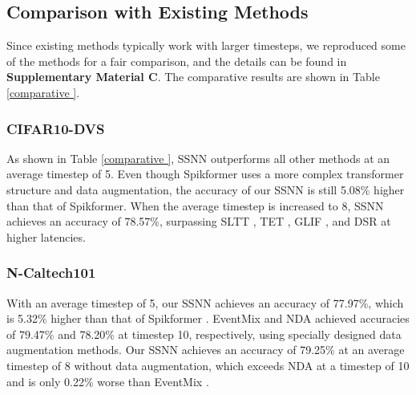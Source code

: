 \documentclass[letterpaper]{article} %
\begin{document}
\subsection{Comparison with Existing Methods}
Since existing methods typically work with larger timesteps, we reproduced some of the methods for a fair comparison, and the details can be found in \textbf{Supplementary Material C}. The comparative results are shown in Table \ref{comparative }.

\subsubsection{CIFAR10-DVS} As shown in Table \ref{comparative }, SSNN outperforms all other methods at an average timestep of 5. Even though Spikformer \cite{Spikformer} uses a more complex transformer structure and data augmentation, the accuracy of our SSNN is still 5.08\% higher than that of Spikformer. When the average timestep is increased to 8, SSNN achieves an accuracy of 78.57\%, surpassing SLTT \cite{SLTT}, TET \cite{TET}, GLIF \cite{GLIF}, and DSR \cite{DSR} at higher latencies.

\subsubsection{N-Caltech101} With an average timestep of 5, our SSNN achieves an accuracy of 77.97\%, which is 5.32\% higher than that of Spikformer \cite{Spikformer}. EventMix \cite{eventmix} and NDA \cite{NDA} achieved accuracies of 79.47\% and 78.20\% at timestep 10, respectively, using specially designed data augmentation methods. Our SSNN achieves an accuracy of 79.25\% at an average timestep of 8 without data augmentation, which exceeds NDA \cite{NDA} at a timestep of 10 and is only 0.22\% worse than EventMix \cite{eventmix}.
\end{document}
